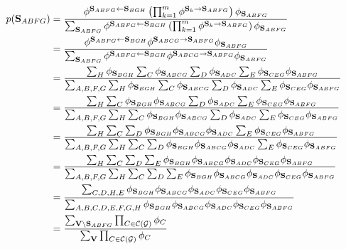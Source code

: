 \documentclass[11pt]{article}
\renewcommand{\vec}[1]{\mathbf{#1}}
\begin{document}
\begin{answertext}{23cm}{}
\begin{align*}
p(\vec{S}_{ABFG}) &=
\frac{
\phi^{\vec{S}_{ABFG} \gets \vec{S}_{BGH}}
\left( \prod_{k=1}^m \phi^{\vec{S}_k \to \vec{S}_{ABFG}} \right) \phi_{\vec{S}_{ABFG}}
}{
\sum_{\vec{S}_{ABFG}} \phi^{\vec{S}_{ABFG} \gets \vec{S}_{BGH}}
\left( \prod_{k=1}^m \phi^{\vec{S}_k \to \vec{S}_{ABFG}} \right) \phi_{\vec{S}_{ABFG}}
}\\
&=
\frac{
\phi^{\vec{S}_{ABFG} \gets \vec{S}_{BGH}}
 \phi^{\vec{S}_{ABCG} \to \vec{S}_{ABFG}}  \phi_{\vec{S}_{ABFG}}
}{
\sum_{\vec{S}_{ABFG}} \phi^{\vec{S}_{ABFG} \gets \vec{S}_{BGH}}
 \phi^{\vec{S}_{ABCG} \to \vec{S}_{ABFG}}  \phi_{\vec{S}_{ABFG}}
}\\
&= \frac{\sum_{H} \phi_{\vec{S}_{BGH}} \sum_{C}\phi_{\vec{S}_{ABCG}}\sum_{D}\phi_{\vec{S}_{ADC}}\sum_{E}\phi_{\vec{S}_{CEG}}\phi_{\vec{S}_{ABFG}}}
{\sum_{A,B,F,G} \sum_{H} \phi_{\vec{S}_{BGH}} \sum_{C}\phi_{\vec{S}_{ABCG}}\sum_{D}\phi_{\vec{S}_{ADC}}\sum_{E}\phi_{\vec{S}_{CEG}}\phi_{\vec{S}_{ABFG}}}\\
&= \frac{\sum_{H} \sum_{C}\phi_{\vec{S}_{BGH}} \phi_{\vec{S}_{ABCG}}\sum_{D}\phi_{\vec{S}_{ADC}}\sum_{E}\phi_{\vec{S}_{CEG}}\phi_{\vec{S}_{ABFG}}}
{\sum_{A,B,F,G} \sum_{H}\sum_{C} \phi_{\vec{S}_{BGH}}\phi_{\vec{S}_{ABCG}}\sum_{D}\phi_{\vec{S}_{ADC}}\sum_{E}\phi_{\vec{S}_{CEG}}\phi_{\vec{S}_{ABFG}}}\\
&= \frac{\sum_{H} \sum_{C}\sum_{D}\phi_{\vec{S}_{BGH}} \phi_{\vec{S}_{ABCG}}\phi_{\vec{S}_{ADC}}\sum_{E}\phi_{\vec{S}_{CEG}}\phi_{\vec{S}_{ABFG}}}
{\sum_{A,B,F,G} \sum_{H}\sum_{C}\sum_{D} \phi_{\vec{S}_{BGH}}\phi_{\vec{S}_{ABCG}}\phi_{\vec{S}_{ADC}}\sum_{E}\phi_{\vec{S}_{CEG}}\phi_{\vec{S}_{ABFG}}}\\
&= \frac{\sum_{H} \sum_{C}\sum_{D}\sum_{E}\phi_{\vec{S}_{BGH}} \phi_{\vec{S}_{ABCG}}\phi_{\vec{S}_{ADC}}\phi_{\vec{S}_{CEG}}\phi_{\vec{S}_{ABFG}}}
{\sum_{A,B,F,G} \sum_{H}\sum_{C}\sum_{D}\sum_{E} \phi_{\vec{S}_{BGH}}\phi_{\vec{S}_{ABCG}}\phi_{\vec{S}_{ADC}}\phi_{\vec{S}_{CEG}}\phi_{\vec{S}_{ABFG}}}\\
&= \frac{\sum_{C,D,H,E} \phi_{\vec{S}_{BGH}} \phi_{\vec{S}_{ABCG}}\phi_{\vec{S}_{ADC}}\phi_{\vec{S}_{CEG}}\phi_{\vec{S}_{ABFG}}}
{\sum_{A,B,C,D,E,F,G,H} \phi_{\vec{S}_{BGH}}\phi_{\vec{S}_{ABCG}}\phi_{\vec{S}_{ADC}}\phi_{\vec{S}_{CEG}}\phi_{\vec{S}_{ABFG}}}\\
&=
\frac{
\sum_{\vec{V} \setminus \vec{S}_{ABFG}} \prod_{C \in {\cal C}({\cal G})} \phi_C
}{
\sum_{\vec{V}} \prod_{C \in {\cal C}({\cal G})} \phi_C
}
\end{align*}

\end{answertext}
\end{document}
